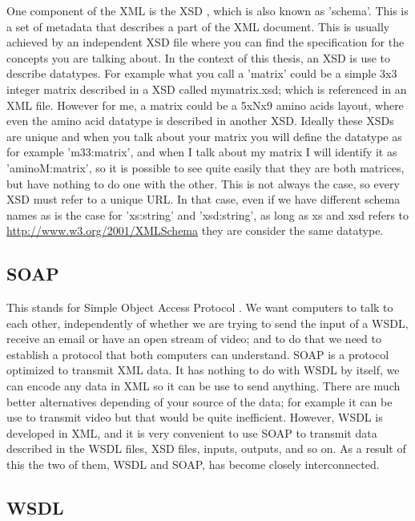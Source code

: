 \documentclass[a4paper,10pt]{article}
\begin{document}
  One component of the XML is the XSD \cite{schema}, which is also known as 'schema'. This is a set of metadata that describes a part of the XML document. This is usually achieved by an independent XSD file where you can find the specification for the concepts you are talking about. In the context of this thesis, an XSD is use to describe datatypes. For example what you call a 'matrix' could be a simple 3x3 integer matrix described in a XSD called mymatrix.xsd; which is referenced in an XML file. However for me, a matrix could be a 5xNx9 amino acids layout, where even the amino acid datatype is described in another XSD. Ideally these XSDs are unique and when you talk about your matrix you will define the datatype as for example 'm33:matrix', and when I talk about my matrix I will identify it as 'aminoM:matrix', so it is possible to see quite easily that they are both matrices, but have nothing to do one with the other. This is not always the case, so every XSD must refer to a unique URL. In that case, even if we have different schema names as is the case for 'xs:string' and 'xsd:string', as long as xs and xsd refers to \url{http://www.w3.org/2001/XMLSchema} they are consider the same datatype.\vspace{3 mm}

  \subsection{SOAP}

  This stands for Simple Object Access Protocol \cite{soap}. We want computers to talk to each other, independently of whether we are trying to send the input of a WSDL, receive an email or have an open stream of video; and to do that we need to establish a protocol that both computers can understand. SOAP is a protocol optimized to transmit XML data. It has nothing to do with WSDL by itself, we can encode any data in XML so it can be use to send anything. There are much better alternatives depending of your source of the data; for example it can be use to transmit video but that would be quite inefficient. However, WSDL is developed in XML, and it is very convenient to use SOAP to transmit data described in the WSDL files, XSD files, inputs, outputs, and so on. As a result of this the two of them, WSDL and SOAP, has become closely interconnected.\vspace{3 mm}

  \subsection{WSDL}
  \label{sec:wsdlDescription}
\end{document}
